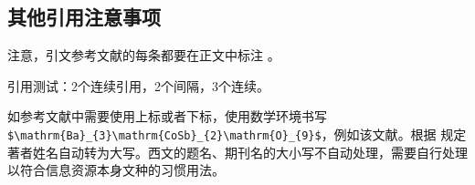 \subsection{其他引用注意事项}

注意，引文参考文献的每条都要在正文中标注
\cite{zhangkun1994,zhukezhen1973,dupont1974bone,zhengkaiqing1987,%
  jiangxizhou1980,jianduju1994,merkt1995rotational,mellinger1996laser,%
  bixon1996dynamics,mahui1995,carlson1981two,taylor1983scanning,%
  taylor1981study,shimizu1983laser,atkinson1982experimental,%
  kusch1975perturbations,guangxi1993,huosini1989guwu,wangfuzhi1865songlun,%
  zhaoyaodong1998xinshidai,biaozhunhua2002tushu,chubanzhuanye2004,%
  who1970factors,peebles2001probability,baishunong1998zhiwu,%
  weinstein1974pathogenic,hanjiren1985lun,dizhi1936dizhi,%
  tushuguan1957tushuguanxue,aaas1883science,fugang2000fengsha,%
  xiaoyu2001chubanye,oclc2000about,scitor2000project%
}。

引用测试：2个连续引用\cite{zhangkun1994,zhukezhen1973}，2个间隔\cite{zhangkun1994,dupont1974bone}，3个连续\cite{zhangkun1994,zhukezhen1973,dupont1974bone}。

如参考文献中需要使用上标或者下标，使用数学环境书写 \verb|$\mathrm{Ba}_{3}\mathrm{CoSb}_{2}\mathrm{O}_{9}$|，例如该文献\cite{kamiya2018nature}。根据  规定著者姓名自动转为大写。西文的题名、期刊名的大小写不自动处理，需要自行处理以符合信息资源本身文种的习惯用法。

